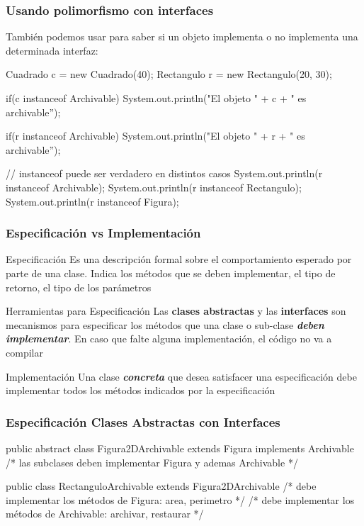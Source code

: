 \documentclass{beamer}
\begin{document}
\begin{frame}[fragile]
  \frametitle{Usando polimorfismo con interfaces}
  También podemos usar  para saber si un objeto
  implementa o no implementa una determinada interfaz:

  \begin{jsmall}
    {
      Cuadrado c = new Cuadrado(40);
      Rectangulo r = new Rectangulo(20, 30);

      if(c instanceof Archivable) {
        System.out.println("El objeto " + c + " es archivable'');
      }

      if(r instanceof Archivable) {
        System.out.println("El objeto " + r + " es archivable'');
      }

      // instanceof puede ser verdadero en distintos casos
      System.out.println(r instanceof Archivable);
      System.out.println(r instanceof Rectangulo);
      System.out.println(r instanceof Figura);      
    }    
  \end{jsmall}
  
\end{frame}

\begin{frame}
  \frametitle{Especificación vs Implementación}

  \begin{block}{Especificación}
    Es una descripción formal sobre el comportamiento esperado por
    parte de una clase. Indica los métodos que se deben implementar,
    el tipo de retorno, el tipo de los parámetros
  \end{block}

  \begin{block}{Herramientas para Especificación}
    Las \textbf{clases abstractas} y las \textbf{interfaces} son
    mecanismos para especificar los métodos que una clase o sub-clase
    \textit{\textbf{deben implementar}}. En caso que falte alguna
    implementación, el código no va a compilar
  \end{block}

  \begin{block}{Implementación}
    Una clase \textit{\textbf{concreta}} que desea satisfacer una
    especificación debe implementar todos los métodos indicados por la
    especificación
  \end{block}
  
\end{frame}

\begin{frame}[fragile]
  \frametitle{Especificación Clases Abstractas con Interfaces}

  \begin{jsmall}
    public abstract class
    Figura2DArchivable extends Figura implements Archivable {
      /* las subclases deben implementar Figura y ademas Archivable */
    }

    public class RectanguloArchivable extends Figura2DArchivable {
      /* debe implementar los métodos de Figura: area, perimetro */
      /* debe implementar los métodos de Archivable: archivar, restaurar */
    }
  \end{jsmall}
  
\end{frame}
\end{document}
